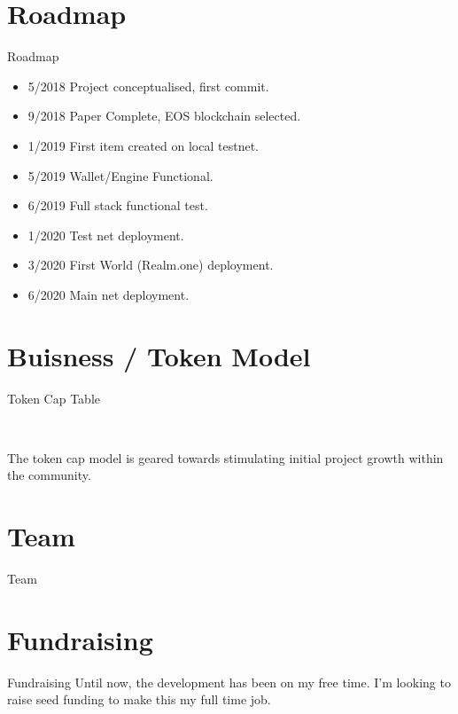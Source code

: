 \documentclass[final, ngerman, xcolor=pdftex, dvipsnames, table, aspectratio=169, 14pt]{beamer}
\begin{document}
\section{Roadmap}
\begin{frame}{Roadmap}
\begin{itemize}
\small
\item{5/2018} Project conceptualised, first commit.
\item{9/2018} Paper Complete, EOS blockchain selected.
\item{1/2019} First item created on local testnet.
\item{5/2019} Wallet/Engine Functional.
\item{6/2019} Full stack functional test.
\item{1/2020} Test net deployment.
\item{3/2020} First World (Realm.one) deployment.
\item{6/2020} Main net deployment.
\end{itemize}

\end{frame}

\section{Buisness / Token Model}
\begin{frame}{Token Cap Table}

\begin{center}

\\
\end{center}
The token cap model is geared towards stimulating initial project growth within the community.
\end{frame}

\section{Team}
\begin{frame}{Team}
\end{frame}

\section{Fundraising}
\begin{frame}{Fundraising}
Until now, the development has been on my free time. I'm looking to raise seed funding to make this my full time job.
\end{frame}
\end{document}
